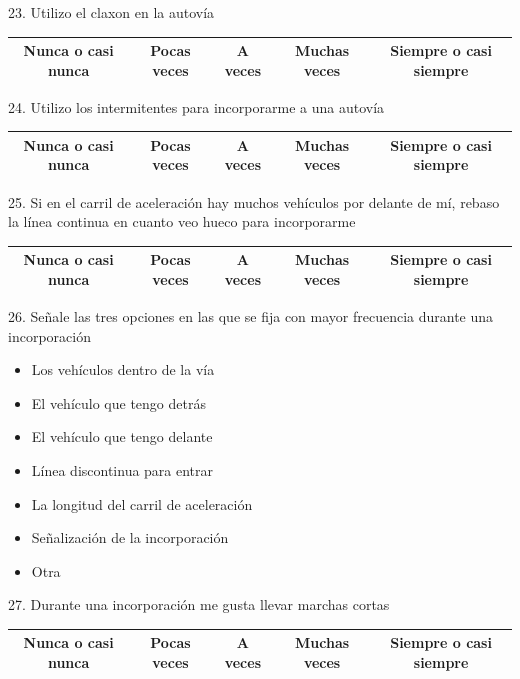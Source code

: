 23. Utilizo el claxon en la autovía
\vspace{-10pt}
\begin{table}[h]
\centering
\begin{tabular}{|c|c|c|c|c|}
\hline
Nunca o casi nunca & Pocas veces & A veces & Muchas veces & Siempre o casi siempre \\ \hline
\end{tabular}
\end{table}

24. Utilizo los intermitentes para incorporarme a una autovía
\vspace{-10pt}
\begin{table}[H]
\centering
\begin{tabular}{|c|c|c|c|c|}
\hline
Nunca o casi nunca & Pocas veces & A veces & Muchas veces & Siempre o casi siempre \\ \hline
\end{tabular}
\end{table}

25. Si en el carril de aceleración hay muchos vehículos por delante de mí, rebaso la línea continua en cuanto veo hueco para incorporarme
\vspace{-10pt}
\begin{table}[h]
\centering
\begin{tabular}{|c|c|c|c|c|}
\hline
Nunca o casi nunca & Pocas veces & A veces & Muchas veces & Siempre o casi siempre \\ \hline
\end{tabular}
\end{table}

26. Señale las tres opciones en las que se fija con mayor frecuencia durante una incorporación
   \begin{itemize}
        \item Los vehículos dentro de la vía
        \item El vehículo que tengo detrás
        \item El vehículo que tengo delante
        \item Línea discontinua para entrar
        \item La longitud del carril de aceleración
        \item Señalización de la incorporación
        \item Otra
   \end{itemize}
   \vspace{10pt}
   
27. Durante una incorporación me gusta llevar marchas cortas
\vspace{-10pt}
\begin{table}[h]
\centering
\begin{tabular}{|c|c|c|c|c|}
\hline
Nunca o casi nunca & Pocas veces & A veces & Muchas veces & Siempre o casi siempre \\ \hline
\end{tabular}
\end{table}

